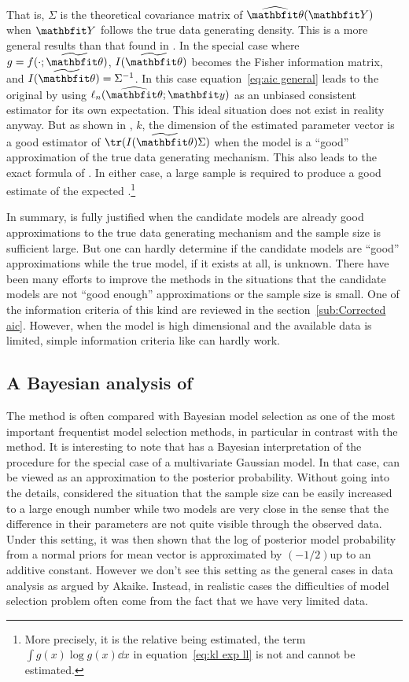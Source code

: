 \documentclass[11pt, hyper, bib, fontset=Minion]{marticle}
\begin{document}
That is, $\Sigma$ is the theoretical covariance matrix of $\hbth(\bfY)$ when
$\bfY$ follows the true data generating density. This is a more general
results than that found in \textcite{Akaike:1973uc}. In the special case where
$g = f(\cdot;\tbth)$, $I(\tbth)$ becomes the Fisher information matrix, and
$I(\tbth) = \Sigma^{-1}$. In this case equation~\eqref{eq:aic general} leads
to the original \aic by using $\ell_n(\hbth;\bfy)$ as an unbiased consistent
estimator for its own expectation. This ideal situation does not exist in
reality anyway. But as shown in \textcite{Shibata:1989tm}, $k$, the dimension
of the estimated parameter vector is a good estimator of $\tr(I(\tbth)\Sigma)$
when the model is a ``good'' approximation of the true data generating
mechanism. This also leads to the exact formula of \aic. In either case, a
large sample is required to produce a good estimate of the expected
\kl.\footnote{More precisely, it is the relative \kl being estimated, the term
  $\int g(x)\log g(x)\dd x$ in equation~\eqref{eq:kl exp ll} is not and cannot
  be estimated.}

In summary, \aic is fully justified when the candidate models are already good
approximations to the true data generating mechanism and the sample size is
sufficient large. But one can hardly determine if the candidate models are
``good'' approximations while the true model, if it exists at all, is unknown.
There have been many efforts to improve the \aic methods in the situations
that the candidate models are not ``good enough'' approximations or the sample
size is small. One of the information criteria of this kind are reviewed in
the section~\ref{sub:Corrected aic}. However, when the model is high
dimensional and the available data is limited, simple information criteria
like \aic can hardly work.

\subsection{A Bayesian analysis of \protect\aic}
\label{sub:A Bayesian analysis of aic}

The \aic method is often compared with Bayesian model selection as one of the
most important frequentist model selection methods, in particular in contrast
with the \bic method. It is interesting to note that \textcite{Akaike:1978ti}
has a Bayesian interpretation of the \aic procedure for the special case of a
multivariate Gaussian model. In that case, \aic can be viewed as an
approximation to the posterior probability. Without going into the details,
\textcite{Akaike:1978ti} considered the situation that the sample size can be
easily increased to a large enough number while two models are very close in
the sense that the difference in their parameters are not quite visible
through the observed data. Under this setting, it was then shown that the log
of posterior model probability from a normal priors for mean vector is
approximated by $(-1/2)$\aic up to an additive constant. However we don't see
this setting as the general cases in data analysis as argued by Akaike.
Instead, in realistic cases the difficulties of model selection problem often
come from the fact that we have very limited data.
\end{document}
